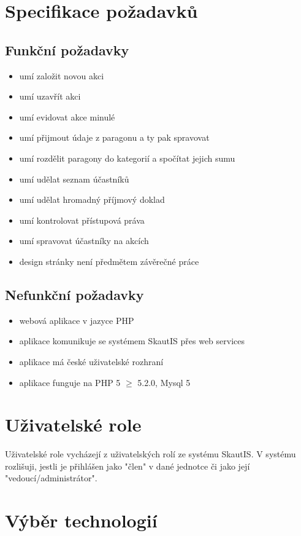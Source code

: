 \documentclass[thesis=B,czech]{FITthesis}[2011/06/14]
\begin{document}
\section{Specifikace požadavků}
\subsection{Funkční požadavky}
\begin{itemize}
	\item umí založit novou akci
	\item umí uzavřít akci
	\item umí evidovat akce minulé
	\item umí přijmout údaje z paragonu a ty pak spravovat
	\item umí rozdělit paragony do kategorií a spočítat jejich sumu
	\item umí udělat seznam účastníků
	\item umí udělat hromadný příjmový doklad
	\item umí kontrolovat přístupová práva
	\item umí spravovat účastníky na akcích
	\item design stránky není předmětem závěrečné práce
\end{itemize}

\subsection{Nefunkční požadavky}
\begin{itemize}
	\item webová aplikace v jazyce PHP
	\item aplikace komunikuje se systémem SkautIS přes web services
	\item aplikace má české uživatelské rozhraní
	\item aplikace funguje na PHP 5 $\geq$ 5.2.0, Mysql 5
\end{itemize}

\section{Uživatelské role}
Uživatelské role vycházejí z uživatelských rolí ze systému SkautIS. V systému rozlišuji, jestli je přihlášen jako "člen" v dané jednotce či jako její "vedoucí/administrátor".

\section{Výběr technologií}
\end{document}
